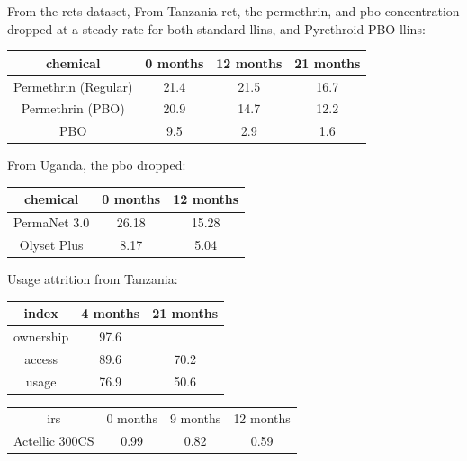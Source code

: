 \documentclass[a4paper, 12pt, twoside]{article}
\begin{document}
From the \gls{rct}s dataset, 
From Tanzania\cite{Protopopoff2018} \gls{rct}, the permethrin, and \gls{pbo} concentration dropped at a steady-rate for both standard \gls{llins}, and Pyrethroid-PBO \gls{llins}:

\begin{center}
	\begin{tabular}{cccc}
		\toprule
		chemical             & 0 months & 12 months & 21 months \\
		\midrule
		Permethrin (Regular) & 21.4     & 21.5      & 16.7      \\
		Permethrin (PBO)     & 20.9     & 14.7      & 12.2      \\
		PBO                  & 9.5      & 2.9       & 1.6       \\
		\bottomrule
	\end{tabular}
\end{center}

From Uganda\cite{Staedke2020}, the \gls{pbo} dropped:
\begin{center}
	\begin{tabular}{c c c}
		\toprule
		chemical     & 0 months & 12 months \\
		\midrule
		PermaNet 3.0 & 26.18    & 15.28     \\
		Olyset Plus  & 8.17     & 5.04      \\
		\bottomrule
	\end{tabular}
\end{center}

Usage attrition from Tanzania\cite{Protopopoff2018}:

\begin{center}
	\begin{tabular}{c c c}
		\toprule
		index     & 4 months & 21 months \\
		\midrule
		ownership & 97.6     &           \\
		access    & 89.6     & 70.2      \\
		usage     & 76.9     & 50.6      \\
		\bottomrule
	\end{tabular}
\end{center}

\begin{center}
	\begin{tabular}{c c c c}
		\gls{irs}      & 0 months & 9 months & 12 months \\
		Actellic 300CS & 0.99     & 0.82     & 0.59      \\
	\end{tabular}
\end{center}
\end{document}
